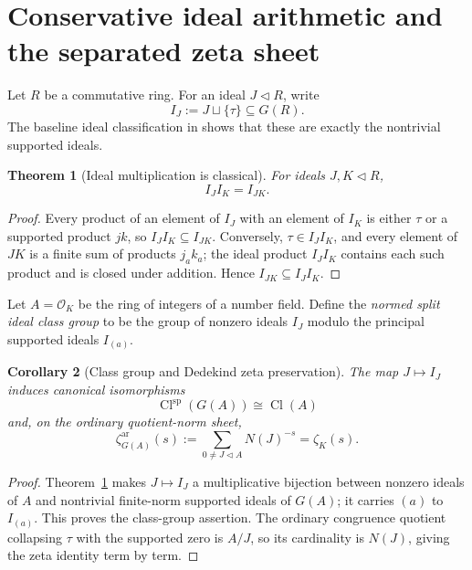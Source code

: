 \documentclass[11pt]{amsart}
\numberwithin{equation}{section}
\newtheorem{theorem}{Theorem}[section]
\newtheorem{corollary}[theorem]{Corollary}
\theoremstyle{definition}
\begin{document}
\section{Conservative ideal arithmetic and the separated zeta sheet}
\label{sec:ideal-zeta}

Let $R$ be a commutative ring.  For an ideal $J\triangleleft R$, write
\[
I_J:=J\sqcup\{\tau\}\subseteq G(R).
\]
The baseline ideal classification in \cite{Globalization,Secondary} shows
that these are exactly the nontrivial supported ideals.

\begin{theorem}[Ideal multiplication is classical]
\label{thm:ideal-multiplication-classical}
For ideals $J,K\triangleleft R$,
\[
I_JI_K=I_{JK}.
\]
\end{theorem}

\begin{proof}
Every product of an element of $I_J$ with an element of $I_K$ is either
$\tau$ or a supported product $jk$, so $I_JI_K\subseteq I_{JK}$.  Conversely,
$\tau\in I_JI_K$, and every element of $JK$ is a finite sum of products
$j_ak_a$; the ideal product $I_JI_K$ contains each such product and is
closed under addition.  Hence $I_{JK}\subseteq I_JI_K$.
\end{proof}

Let $A=\mathcal O_K$ be the ring of integers of a number field.  Define the
\emph{normed split ideal class group} to be the group of nonzero ideals
$I_J$ modulo the principal supported ideals $I_{(a)}$.

\begin{corollary}[Class group and Dedekind zeta preservation]
\label{cor:dedekind-preservation}
The map $J\mapsto I_J$ induces canonical isomorphisms
\[
\operatorname{Cl}^{\mathrm{sp}}(G(A))\cong\operatorname{Cl}(A)
\]
and, on the ordinary quotient-norm sheet,
\[
\zeta^{\mathrm{ar}}_{G(A)}(s)
:=\sum_{0\ne J\triangleleft A}N(J)^{-s}
=\zeta_K(s).
\]
\end{corollary}

\begin{proof}
Theorem~\ref{thm:ideal-multiplication-classical} makes $J\mapsto I_J$ a
multiplicative bijection between nonzero ideals of $A$ and nontrivial
finite-norm supported ideals of $G(A)$; it carries $(a)$ to $I_{(a)}$.
This proves the class-group assertion.  The ordinary congruence quotient
collapsing $\tau$ with the supported zero is $A/J$, so its cardinality is
$N(J)$, giving the zeta identity term by term.
\end{proof}
\end{document}
